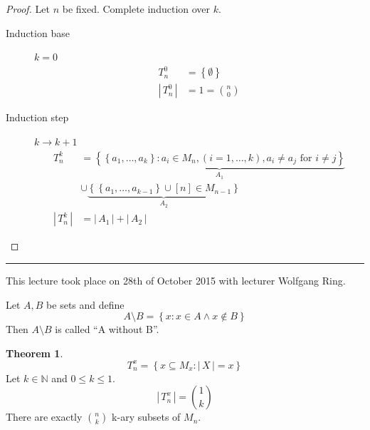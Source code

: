 \documentclass[a4paper,landscape,twocolumn]{article}
\theoremstyle{definition}
\newtheorem{theorem}{Theorem}
\newcommand\set[1]{\left\{#1\right\}}
\newcommand\card[1]{\left|\,#1\,\right|}
\newcommand\meta[3]{\hrule{} This #1 took place on #2 with lecturer #3.\par}
\begin{document}
\begin{proof}
  Let $n$ be fixed. Complete induction over $k$.
  \begin{description}
    \item[Induction base] $k=0$
      \begin{align*}
        T_n^0        &= \set{\emptyset} \\
        \card{T_n^0} &= 1 = \binom n0
      \end{align*}
    \item[Induction step] $k\rightarrow k+1$
      \begin{align*}
        T_n^k &= \underbrace{\set{\set{a_1, \ldots, a_k}: a_i \in M_n, (i = 1, \ldots, k), a_i \neq a_j \text{ for } i \neq j}}_{A_1} \\
              &\cup \underbrace{\set{\set{a_1, \ldots, a_{k-1}} \cup [n] \in M_{n-1}}}_{A_2} \\
        \card{T_n^k} &= \card{A_1} + \card{A_2}
      \end{align*}
  \end{description}
\end{proof}

\meta{lecture}{28th of October 2015}{Wolfgang Ring}

Let $A, B$ be sets and define
\[ A \setminus B = \set{x: x \in A \land x \not\in B} \]
Then $A \setminus B$ is called \enquote{A without B}.

\begin{theorem}
  \[ T_n^x = \set{x \subseteq M_x: \card{X} = x} \]
  Let $k \in \mathbb{N}$ and $0 \leq k \leq 1$.
  \[ \card{T_n^x} = \binom{1}{k} \]
  There are exactly $\binom{n}{k}$ k-ary subsets of $M_n$.
\end{theorem}
\end{document}
